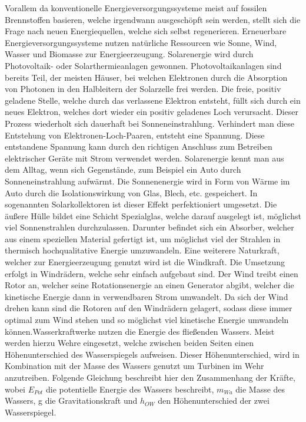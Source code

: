 Vorallem da konventionelle Energieversorgungssysteme meist auf fossilen
Brennstoffen basieren, welche irgendwann ausgeschöpft sein werden, stellt sich
die Frage nach neuen Energiequellen, welche sich selbst regenerieren.
Erneuerbare Energieversorgungssysteme nutzen natürliche Ressourcen wie Sonne,
Wind, Wasser und Biomasse zur Energieerzeugung. Solarenergie wird durch
Photovoltaik- oder Solarthermieanlagen gewonnen. Photovoltaikanlagen sind
bereits Teil, der meisten Häuser, bei welchen Elektronen durch die Absorption
von Photonen in den Halbleitern der Solarzelle frei werden. Die freie, positiv
geladene Stelle, welche durch das verlassene Elektron entsteht, füllt sich
durch ein neues Elektron, welches dort wieder ein positiv geladenes Loch
verursacht. Dieser Prozess wiederholt sich dauerhaft bei Sonneneinstrahlung.
Verhindert man diese Entstehung von Elektronen-Loch-Paaren, entsteht eine
Spannung. Diese entstandene Spannung kann durch den richtigen Anschluss zum
Betreiben elektrischer Geräte mit Strom verwendet
werden.\cite{renner2010grundlagen} Solarenergie kennt man aus dem Alltag, wenn
sich Gegenstände, zum Beispiel ein Auto durch Sonneneinstrahlung aufwärmt. Die
Sonnenenergie wird in Form von Wärme im Auto durch die Isolationswirkung von
Glas, Blech, etc. gespeichert. In sogenannten Solarkollektoren ist dieser
Effekt perfektioniert umgesetzt. Die äußere Hülle bildet eine Schicht
Spezialglas, welche darauf ausgelegt ist, möglichst viel Sonnenstrahlen
durchzulassen. Darunter befindet sich ein Absorber, welcher aus einem
speziellen Material gefertigt ist, um möglichst viel der Strahlen in thermisch
hochqualitative Energie umzuwandeln.\cite{schabbach2014solarthermie} Eine
weiterere Naturkraft, welcher zur Energieerzeugung genutzt wird ist die
Windkraft. Die Umsetzung erfolgt in Windrädern, welche sehr einfach aufgebaut
sind. Der Wind treibt einen Rotor an, welcher seine Rotationsenergie an einen
Generator abgibt, welcher die kinetische Energie dann in verwendbaren Strom
umwandelt. Da sich der Wind drehen kann sind die Rotoren auf den Windrädern
gelagert, sodass diese immer optimal zum Wind stehen und so möglichst viel
kinetische Energie umwandeln
können.\cite{osterhage2015windkraft}Wasserkraftwerke nutzen die Energie des
fließenden Wassers. Meist werden hierzu Wehre eingesetzt, welche zwischen
beiden Seiten einen Höhenunterschied des Wasserspiegels aufweisen. Dieser
Höhenunterschied, wird in Kombination mit der Masse des Wassers genutzt um
Turbinen im Wehr anzutreiben. Folgende Gleichung beschreibt hier den
Zusammenhang der Kräfte, wobei $E_{Pot}$ die potentielle Energie des Wassers
beschreibt, $m_{Wa}$ die Masse des Wassers, g die Gravitationskraft und
$h_{OW}$ den Höhenunterschied der zwei Wasserspiegel.

